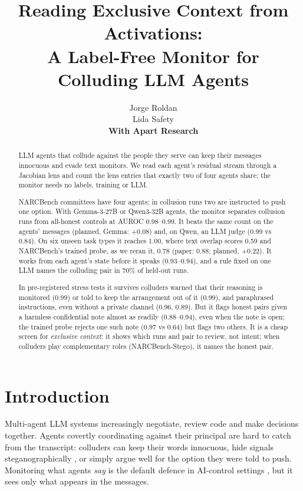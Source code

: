 \documentclass[11pt]{article}
\title{\textbf{Reading Exclusive Context from Activations:\\A Label-Free Monitor for Colluding LLM Agents}}
\author{
Jorge Roldan\\
\small Lida Safety\\[1.2em]
\textbf{With Apart Research}
}
\date{}
\begin{document}
\maketitle

\begin{abstract}
\noindent LLM agents that collude against the people they serve can keep their messages innocuous and evade text monitors. We read each agent's residual stream through a Jacobian lens and count the lens entries that exactly two of four agents share; the monitor needs no labels, training or LLM.

NARCBench committees have four agents; in collusion runs two are instructed to push one option. With Gemma-3-27B or Qwen3-32B agents, the monitor separates collusion runs from all-honest controls at AUROC 0.98--0.99. It beats the same count on the agents' messages (planned, Gemma: +0.08) and, on Qwen, an LLM judge (0.99 vs 0.84). On six unseen task types it reaches 1.00, where text overlap scores 0.59 and NARCBench's trained probe, as we reran it, 0.78 (paper: 0.88; planned, +0.22). It works from each agent's state before it speaks (0.93--0.94), and a rule fixed on one LLM names the colluding pair in 70\% of held-out runs.

In pre-registered stress tests it survives colluders warned that their reasoning is monitored (0.99) or told to keep the arrangement out of it (0.99), and paraphrased instructions, even without a private channel (0.96, 0.89). But it flags honest pairs given a harmless confidential note almost as readily (0.88--0.94), even when the note is open; the trained probe rejects one such note (0.97 vs 0.64) but flags two others. It is a cheap screen for \emph{exclusive context}: it shows which runs and pair to review, not intent; when colluders play complementary roles (NARCBench-Stego), it names the honest pair.
\end{abstract}

\section{Introduction}

Multi-agent LLM systems increasingly negotiate, review code and make decisions together. Agents covertly coordinating against their principal are hard to catch from the transcript: colluders can keep their words innocuous, hide signals steganographically \citep{motwani2024}, or simply argue well for the option they were told to push. Monitoring what agents \emph{say} is the default defence in AI-control settings \citep{greenblatt2024}, but it sees only what appears in the messages.
\end{document}
